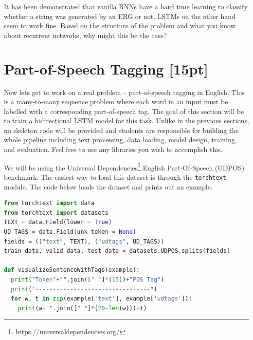 \documentclass[a4paper,10pt]{article}
\begin{document}
\vspace{5pt}
\begin{taskbox}
 It has been demonstrated that vanilla RNNs have a hard time learning to classify whether a string was generated by an ERG or not. LSTMs on the other hand seem to work fine. Based on the structure of the problem and what you know about recurrent networks, why might this be the case? 
\end{taskbox}
\vspace{5pt}

\section{Part-of-Speech Tagging [15pt]}
Now lets get to work on a real problem -- part-of-speech tagging in English. This is a many-to-many sequence problem where each word in an input must be labelled with a corresponding part-of-speech tag. The goal of this section will be to train a bidirectional LSTM model for this task. Unlike in the previous sections, no skeleton code will be provided and students are responsible for building the whole pipeline including text processing, data loading, model design, training, and evaluation. Feel free to use any libraries you wish to accomplish this.

We will be using the Universal Dependencies\footnote{https://universaldependencies.org/} English Part-Of-Speech (UDPOS) benchmark. The easiest way to load this dataset is through the \texttt{torchtext} module. The code below loads the dataset and prints out an example. 


\begin{center}
\begin{minipage}{0.8\textwidth}
\begin{lstlisting}[language=Python, caption=Loading the UD En POS benchmark]
from torchtext import data
from torchtext import datasets
TEXT = data.Field(lower = True)
UD_TAGS = data.Field(unk_token = None)
fields = (("text", TEXT), ("udtags", UD_TAGS))
train_data, valid_data, test_data = datasets.UDPOS.splits(fields)

def visualizeSentenceWithTags(example):
  print("Token"+"".join([" "]*(15))+"POS Tag")
  print("---------------------------------")
  for w, t in zip(example['text'], example['udtags']):
    print(w+"".join([" "]*(20-len(w)))+t)

\end{lstlisting}
\end{minipage}
\end{center}
\end{document}
